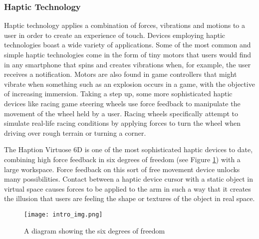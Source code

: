 \documentclass[a4paper]{article}
\begin{document}
\subsubsection{Haptic Technology}
Haptic technology applies a combination of forces, vibrations and motions to a user in order to create an experience of touch. Devices employing haptic technologies boast a wide variety of applications. Some of the most common and simple haptic technologies come in the form of tiny motors that users would find in any smartphone that spins and creates vibrations when, for example, the user receives a notification. Motors are also found in game controllers that might vibrate when something such as an explosion occurs in a game, with the objective of increasing immersion. Taking a step up, some more sophisticated haptic devices like racing game steering wheels use force feedback to manipulate the movement of the wheel held by a user. Racing wheels specifically attempt to simulate real-life racing conditions by applying forces to turn the wheel when driving over rough terrain or turning a corner. 

\vspace{5mm}
\noindent The Haption Virtuose 6D \cite{ref1} is one of the most sophisticated haptic devices to date, combining high force feedback in six degrees of freedom (see Figure \ref{fig:intro_img}) with a large workspace. Force feedback on this sort of free movement device unlocks many possibilities. Contact between a haptic device cursor with a static object in virtual space causes forces to be applied to the arm in such a way that it creates the illusion that users are feeling the shape or textures of the object in real space. 

\begin{figure}[H]
    \centering
    \texttt{[image: intro\_img.png]}
    \caption{A diagram showing the six degrees of freedom \cite{ref2}}
    \label{fig:intro_img}
\end{figure}
\end{document}
